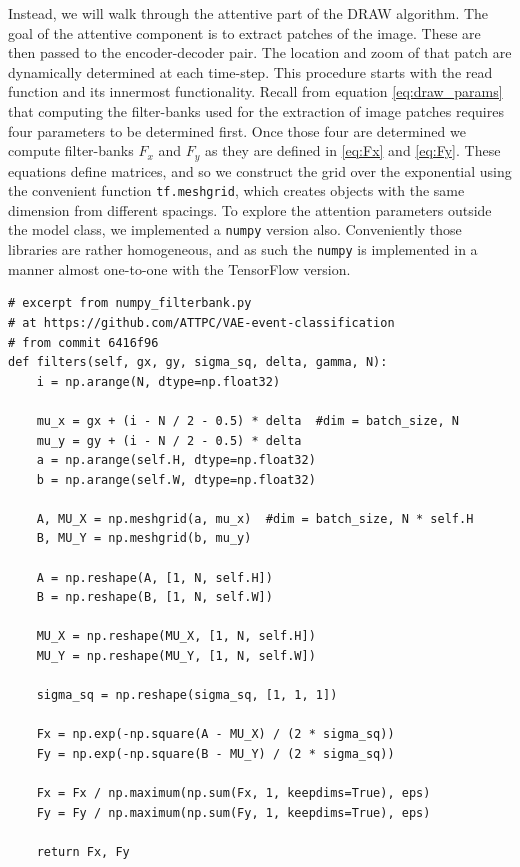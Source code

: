 Instead, we will walk through the attentive part of the DRAW algorithm. The goal of the attentive component is to extract patches of the image. These are then passed to the encoder-decoder pair. The location and zoom of that patch are dynamically determined at each time-step. This procedure starts with the read function and its innermost functionality. Recall from equation \ref{eq:draw_params}  that computing the filter-banks used for the extraction of image patches requires four parameters to be determined first. Once those four are determined we compute filter-banks $F_x$ and $F_y$ as they are defined in \ref{eq:Fx} and \ref{eq:Fy}. These equations define matrices, and so we construct the grid over the exponential using the convenient function \lstinline{tf.meshgrid}, which creates objects with the same dimension from different spacings. To explore the attention parameters outside the model class, we implemented a \lstinline{numpy} version also. Conveniently those libraries are rather homogeneous, and as such the \lstinline{numpy} is implemented in a manner almost one-to-one with the TensorFlow version. 


\begin{minipage}{\linewidth}
\begin{lstlisting}[language=iPython]
# excerpt from numpy_filterbank.py
# at https://github.com/ATTPC/VAE-event-classification
# from commit 6416f96
def filters(self, gx, gy, sigma_sq, delta, gamma, N):
    i = np.arange(N, dtype=np.float32)

    mu_x = gx + (i - N / 2 - 0.5) * delta  #dim = batch_size, N
    mu_y = gy + (i - N / 2 - 0.5) * delta
    a = np.arange(self.H, dtype=np.float32)
    b = np.arange(self.W, dtype=np.float32)

    A, MU_X = np.meshgrid(a, mu_x)  #dim = batch_size, N * self.H
    B, MU_Y = np.meshgrid(b, mu_y)

    A = np.reshape(A, [1, N, self.H])
    B = np.reshape(B, [1, N, self.W])

    MU_X = np.reshape(MU_X, [1, N, self.H])
    MU_Y = np.reshape(MU_Y, [1, N, self.W])

    sigma_sq = np.reshape(sigma_sq, [1, 1, 1])

    Fx = np.exp(-np.square(A - MU_X) / (2 * sigma_sq))
    Fy = np.exp(-np.square(B - MU_Y) / (2 * sigma_sq))

    Fx = Fx / np.maximum(np.sum(Fx, 1, keepdims=True), eps)
    Fy = Fy / np.maximum(np.sum(Fy, 1, keepdims=True), eps)

    return Fx, Fy
\end{lstlisting}
\end{minipage}

